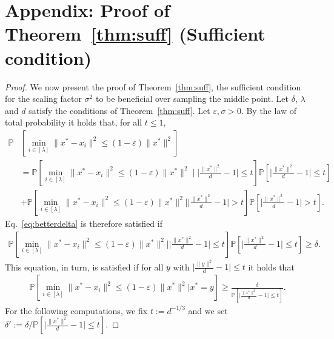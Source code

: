 \section{Appendix: Proof of Theorem~\ref{thm:suff} (Sufficient condition)}
\label{sec:suff}
\begin{proof}

We now present the proof of Theorem~\ref{thm:suff}, the sufficient condition for the scaling factor $\sigma^2$ to be beneficial over sampling the middle point. 
Let $\delta$, $\lambda$ and $d$ satisfy the conditions of Theorem~\ref{thm:suff}. 
Let $\varepsilon,\sigma>0$. By the law of total probability it holds that, for all $t\leq 1$,  
\begin{align*}
  \mathbb{P}&\left[\min_{i\in[\lambda]}\lVert x^*-x_i\rVert^2 \leq \left(1-\varepsilon\right)\lVert x^*\rVert^2\right] \\ &=\mathbb{P}\left[\min_{i\in[\lambda]}\lVert x^*-x_i\rVert^2 \leq \left(1-\varepsilon\right)\lVert x^*\rVert^2 \mid \lvert\frac{\lVert x^*\rVert^2}{d}-1\rvert\leq t\right]
  \mathbb{P}\left[\lvert\frac{\lVert x^*\rVert^2}{d}-1\rvert\leq t\right]\\
  &+\mathbb{P}\left[\min_{i\in[\lambda]}\lVert x^*-x_i\rVert^2 \leq \left(1-\varepsilon\right)\lVert x^*\rVert^2\big| \lvert\frac{\lVert x^*\rVert^2}{d}-1\rvert> t\right]
  \mathbb{P}\left[\lvert\frac{\lVert x^*\rVert^2}{d}-1\rvert> t\right].
\end{align*}
Eq.~\ref{eq:betterdelta} is therefore satisfied if 
\begin{eqnarray*}
\mathbb{P}\left[\min_{i\in[\lambda]}\lVert x^*-x_i\rVert^2 \leq \left(1-\varepsilon\right)\lVert x^*\rVert^2\big| \lvert\frac{\lVert x^*\rVert^2}{d}-1\rvert\leq t\right]
  \mathbb{P}\left[\lvert\frac{\lVert x^*\rVert^2}{d}-1\rvert\leq t\right]\geq \delta.
\end{eqnarray*}
This equation, in turn, is satisfied if for all $y$ with $\lvert\frac{\rVert y\rVert^2}{d}-1\rvert\leq t$ it holds that
\begin{eqnarray}
\mathbb{P}\left[\min_{i\in[\lambda]}\lVert x^*-x_i\rVert^2 \leq \left(1-\varepsilon\right)\lVert x^*\rVert^2\big|x^*=y\right]
\geq \frac{\delta}{\mathbb{P}\left[\lvert\frac{\lVert x^*\rVert^2}{d}-1\rvert\leq t\right]}.
\label{eq:suff2}
\end{eqnarray}
For the following computations, we fix $t:=d^{-1/3}$ and we set $\delta':=\delta/\mathbb{P}\left[\lvert\frac{\lVert x^*\rVert^2}{d}-1\rvert\leq t\right]$.


\end{proof}
